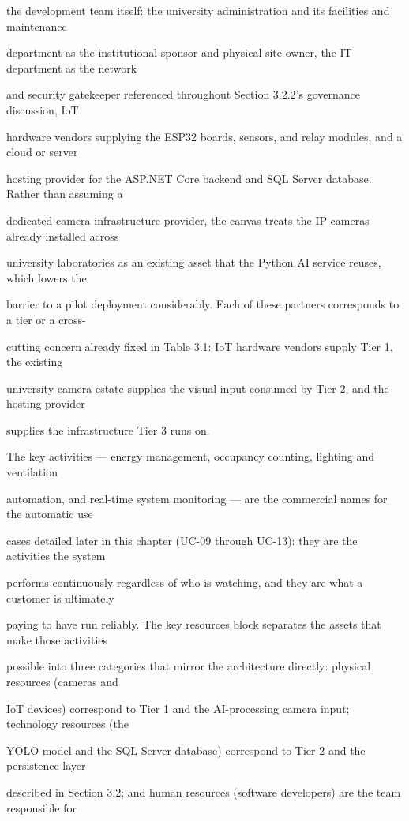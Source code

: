 the development team itself: the university administration and its facilities and maintenance

department as the institutional sponsor and physical site owner, the IT department as the network

and security gatekeeper referenced throughout Section 3.2.2's governance discussion, IoT

hardware vendors supplying the ESP32 boards, sensors, and relay modules, and a cloud or server

hosting provider for the ASP.NET Core backend and SQL Server database. Rather than assuming a

dedicated camera infrastructure provider, the canvas treats the IP cameras already installed across

university laboratories as an existing asset that the Python AI service reuses, which lowers the

barrier to a pilot deployment considerably. Each of these partners corresponds to a tier or a cross-

cutting concern already fixed in Table 3.1: IoT hardware vendors supply Tier 1, the existing

university camera estate supplies the visual input consumed by Tier 2, and the hosting provider

supplies the infrastructure Tier 3 runs on.

The key activities --- energy management, occupancy counting, lighting and ventilation

automation, and real-time system monitoring --- are the commercial names for the automatic use

cases detailed later in this chapter (UC-09 through UC-13): they are the activities the system

performs continuously regardless of who is watching, and they are what a customer is ultimately

paying to have run reliably. The key resources block separates the assets that make those activities

possible into three categories that mirror the architecture directly: physical resources (cameras and

IoT devices) correspond to Tier 1 and the AI-processing camera input; technology resources (the

YOLO model and the SQL Server database) correspond to Tier 2 and the persistence layer

described in Section 3.2; and human resources (software developers) are the team responsible for

